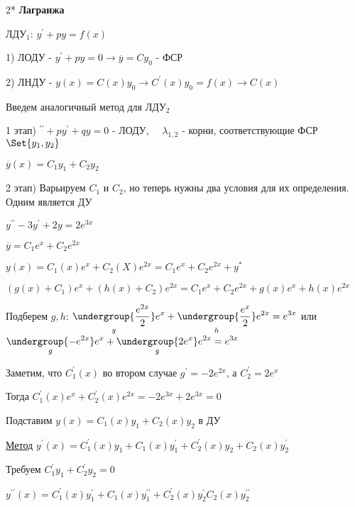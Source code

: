 \documentclass[12pt]{article}
\begin{document}
    \vspace{10mm}

    2* \textbf{Лагранжа}

    \Mem ЛДУ$\displaystyle _1$: $\displaystyle y^\prime + py = f(x)$

    1) ЛОДУ - $\displaystyle y^\prime + py = 0 \to \overline{y} = Cy_0$ - ФСР

    2) ЛНДУ - $\displaystyle y(x) = C(x)y_0 \longrightarrow C^\prime(x) y_0 = f(x) \to C(x)$

    \Nota Введем аналогичный метод для ЛДУ$\displaystyle _2$

    1 этап) $\displaystyle ^{\prime\prime} + py^\prime + qy = 0$ - ЛОДУ, $\displaystyle \quad \lambda_{1, 2}$ - корни, соответствующие ФСР $\displaystyle \Set{y_1, y_2}$

    $\displaystyle \overline{y}(x) = C_1 y_1 + C_2 y_2$

    2 этап) Варьируем $\displaystyle C_1$ и $\displaystyle C_2$, но теперь нужны два условия для их определения. Одним является ДУ

    \Ex $\displaystyle y^{\prime\prime} - 3y^\prime + 2y = 2e^{3x}$

    $\displaystyle \overline{y} = C_1 e^x + C_2 e^{2x}$

    $\displaystyle y(x) = C_1(x)e^x + C_2(X)e^{2x} = C_1 e^x + C_2 e^{2x} + y^*$

    $\displaystyle (g(x) + C_1)e^x + (h(x) + C_2)e^{2x} = C_1 e^x + C_2 e^{2x} + g(x)e^x + h(x)e^{2x}$

    Подберем $g, h$: $\displaystyle \underset{g}{\undergroup{\frac{e^{2x}}{2}}}e^x + \underset{h}{\undergroup{\frac{e^x}{2}}}e^{2x} = e^{3x}$ или
    $\displaystyle \underset{g}{\undergroup{-e^{2x}}} e^x + \underset{g}{\undergroup{2e^x}} e^{2x} = e^{3x}$

    Заметим, что $\displaystyle C_1^\prime(x)$ во втором случае $\displaystyle g^\prime = -2e^{2x}$, а $\displaystyle C_2^\prime = 2e^x$

    Тогда $\displaystyle C_1^\prime(x) e^x + C^\prime_2 (x) e^{2x} = -2e^{3x} + 2e^{3x} = 0$

    \Nota Подставим $\displaystyle y(x) = C_1 (x) y_1 + C_2 (x) y_2$ в ДУ

    \underline{Метод} $\displaystyle y^\prime(x) = C^\prime_1(x) y_1 + C_1(x)y^\prime_1 + C^\prime_2(x) y_2 + C_2(x)y^\prime_2$

    Требуем $\displaystyle C^\prime_1 y_1 + C_2^\prime y_2 = 0$

    $\displaystyle y^{\prime\prime}(x) = C_1^\prime (x) y_1^\prime + C_1 (x) y_1^{\prime\prime} + C_2^\prime (x) y_2^\prime C_2 (x) y_2^{\prime\prime}$
\end{document}
